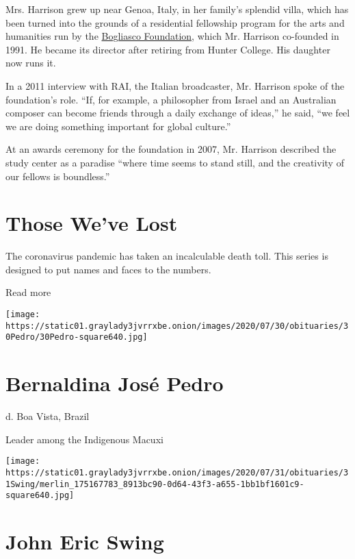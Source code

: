 Mrs. Harrison grew up near Genoa, Italy, in her family's splendid villa,
which has been turned into the grounds of a residential fellowship
program for the arts and humanities run by the
\href{https://www.bfny.org/}{Bogliasco Foundation}, which Mr. Harrison
co-founded in 1991. He became its director after retiring from Hunter
College. His daughter now runs it.

In a 2011 interview with RAI, the Italian broadcaster, Mr. Harrison
spoke of the foundation's role. ``If, for example, a philosopher from
Israel and an Australian composer can become friends through a daily
exchange of ideas,'' he said, ``we feel we are doing something important
for global culture.''

At an awards ceremony for the foundation in 2007, Mr. Harrison described
the study center as a paradise ``where time seems to stand still, and
the creativity of our fellows is boundless.''

\href{https://www.nytimes3xbfgragh.onion/interactive/2020/obituaries/people-died-coronavirus-obituaries.html?action=click\&pgtype=Article\&state=default\&region=BELOW_MAIN_CONTENT\&context=covid_obits_promo}{}

\hypertarget{those-weve-lost}{%
\section{Those We've Lost}\label{those-weve-lost}}

The coronavirus pandemic has taken an incalculable death toll. This
series is designed to put names and faces to the numbers.

Read more

\texttt{[image: https://static01.graylady3jvrrxbe.onion/images/2020/07/30/obituaries/30Pedro/30Pedro-square640.jpg]}

\hypertarget{bernaldina-josuxe9-pedro}{%
\section{Bernaldina José Pedro}\label{bernaldina-josuxe9-pedro}}

d. Boa Vista, Brazil

Leader among the Indigenous Macuxi

\texttt{[image: https://static01.graylady3jvrrxbe.onion/images/2020/07/31/obituaries/31Swing/merlin\_175167783\_8913bc90-0d64-43f3-a655-1bb1bf1601c9-square640.jpg]}

\hypertarget{john-eric-swing}{%
\section{John Eric Swing}\label{john-eric-swing}}

